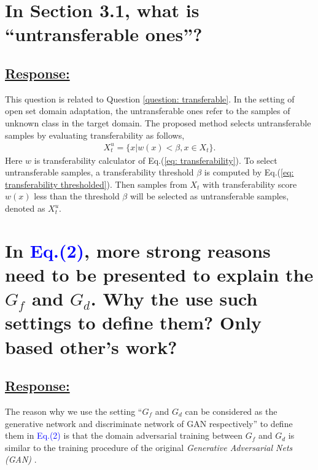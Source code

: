 \section{In Section 3.1, what is ``untransferable ones''?}
\subsection*{\underline{\textbf{Response:}}}

This question is related to Question \ref{question: transferable}.
In the setting of open set domain adaptation, the untransferable ones refer to the samples of unknown class in the target domain.
The proposed method selects untransferable samples by evaluating transferability as follows,
\begin{equation}
    \label{eq: split target examples untrnasferable}
    \begin{split}
        X_t^u=\{x|w(x) < \beta, x \in X_t \}.
    \end{split}
\end{equation}
Here $w$ is transferability calculator of Eq.(\ref{eq: transferability}).
To select untransferable samples, a transferability threshold $\beta$ is computed by Eq.(\ref{eq: transferability thresholded}).
Then samples from $X_t$ with transferability score $w(x)$ less than the threshold $\beta$ will be selected as untransferable samples, denoted as $X_t^u$.

\section{In \textcolor{blue}{Eq.(2)}, more strong reasons need to be presented to explain the $G_f$ and $G_d$. Why the use such settings to define them? Only based other's work?}
\subsection*{\underline{\textbf{Response:}}}

The reason why we use the setting ``$G_f$ and $G_d$ can be considered as the generative network and discriminate network of GAN respectively'' to define them in \textcolor{blue}{Eq.(2)} is that the domain adversarial training between $G_f$ and $G_d$ is similar to the training procedure of the original \textit{Generative Adversarial Nets (GAN)} \cite{goodfellow2014generative}.

